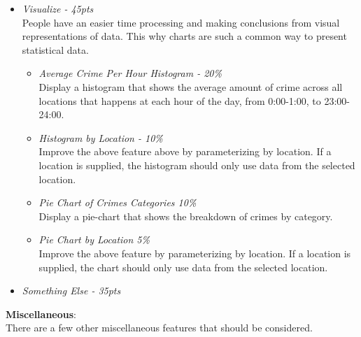 \documentclass[12pt]{article}
\begin{document}
\begin{itemize}
\item \textit{Visualize - 45pts} \\
People have an easier time processing and making conclusions from visual representations of data. This why charts are such a common way to present statistical data.
\begin{itemize}
\item \textit{Average Crime Per Hour Histogram - 20\%} \\
Display a histogram that shows the average amount of crime across all locations that happens at each hour of the day, from 0:00-1:00, to 23:00-24:00.
\item \textit{Histogram by Location - 10\%} \\
Improve the above feature above by parameterizing by location. If a location is supplied, the histogram should only use data from the selected location.
\item \textit{Pie Chart of Crimes Categories 10\%} \\
Display a pie-chart that shows the breakdown of crimes by category.
\item \textit{Pie Chart by Location 5\%} \\
Improve the above feature by parameterizing by location. If a location is supplied, the chart should only use data from the selected location.
\end{itemize}

\item \textit{Something Else - 35pts} \\

\end{itemize}


\newpage
\noindent \textbf{Miscellaneous}: \\
There are a few other miscellaneous features that should be considered.
\end{document}
